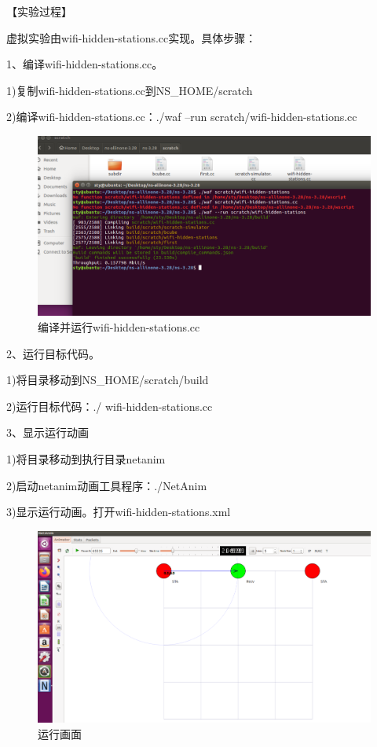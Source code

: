 \documentclass[lang=cn,11pt,a4paper,cite=authoryear]{elegantpaper}
\begin{document}
【实验过程】

虚拟实验由wifi-hidden-stations.cc实现。具体步骤：

1、编译wifi-hidden-stations.cc。

1)复制wifi-hidden-stations.cc到NS\_HOME/scratch

2)编译wifi-hidden-stations.cc：./waf –run scratch/wifi-hidden-stations.cc

\begin{figure}[htbp]
	\centering
	\includegraphics[width=0.9\linewidth]{image/screenshot018}
	\caption{编译并运行wifi-hidden-stations.cc}
	\label{fig:screenshot018}
\end{figure}

2、运行目标代码。

1)将目录移动到NS\_HOME/scratch/build

2)运行目标代码：./ wifi-hidden-stations.cc

3、显示运行动画

1)将目录移动到执行目录netanim

2)启动netanim动画工具程序：./NetAnim

3)显示运行动画。打开wifi-hidden-stations.xml


\begin{figure}[htbp]
	\centering
	\includegraphics[width=0.9\linewidth]{image/screenshot020}
	\caption{运行画面}
	\label{fig:screenshot020}
\end{figure}
\end{document}
